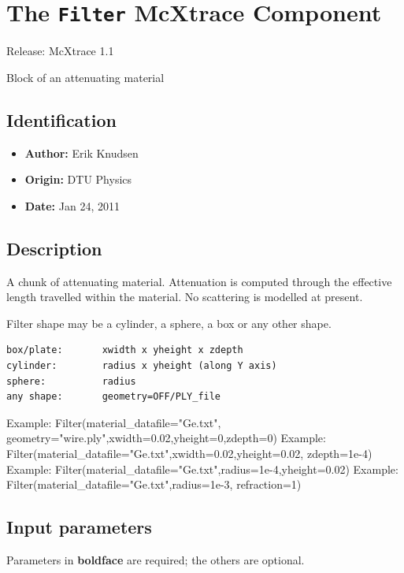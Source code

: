 \section{The \texttt{Filter} McXtrace Component}
Release: McXtrace 1.1

Block of an attenuating material

\subsection*{Identification}
\begin{itemize}
  \item \textbf{Author:} Erik Knudsen
  \item \textbf{Origin:} DTU Physics
  \item \textbf{Date:} Jan 24, 2011
\end{itemize}

\subsection*{Description}
A chunk of attenuating material. Attenuation is computed through the effective length travelled within the material. No scattering is modelled at present.

Filter shape may be a cylinder, a sphere, a box or any other shape.

\begin{verbatim}
box/plate:       xwidth x yheight x zdepth
cylinder:        radius x yheight (along Y axis)
sphere:          radius
any shape:       geometry=OFF/PLY_file
\end{verbatim}

Example: Filter(material\_datafile="Ge.txt", geometry="wire.ply",xwidth=0.02,yheight=0,zdepth=0) Example: Filter(material\_datafile="Ge.txt",xwidth=0.02,yheight=0.02, zdepth=1e-4) Example: Filter(material\_datafile="Ge.txt",radius=1e-4,yheight=0.02) Example: Filter(material\_datafile="Ge.txt",radius=1e-3, refraction=1)

\subsection*{Input parameters}
Parameters in \textbf{boldface} are required; the others are optional.

